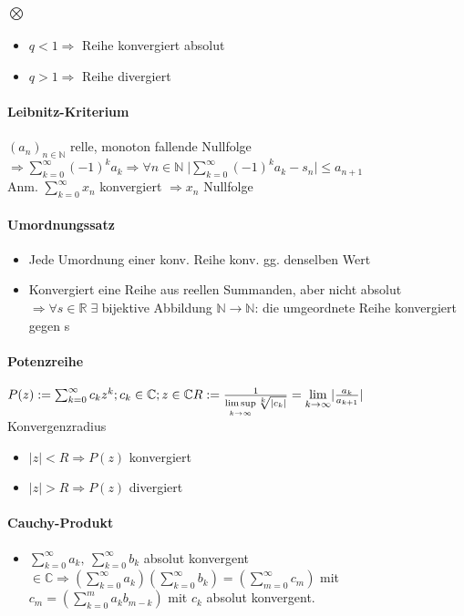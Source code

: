 \documentclass[paper=a3,paper=landscape, fontsize=9pt, DIV=30]{scrartcl}
\newcommand{\real}{{\mathbb{R}}}
\newcommand{\compl}{\mathbb{C}}
\newcommand{\nat}{\mathbb{N}}
\newcommand{\aseq}{(a_n)_{n \in \nat}}
\begin{document}
\begin{multicols*}{4}
  \paragraph{$\bigotimes$}
  \begin{itemize}
  \item $q < 1 \Rightarrow$ Reihe konvergiert absolut
  \item $q > 1 \Rightarrow$ Reihe divergiert
  \end{itemize}

  \paragraph{Leibnitz-Kriterium}
  $\aseq$ relle, monoton fallende Nullfolge $ \Rightarrow \sum_{k=0}^{\infty} (-1)^ka_k \Rightarrow \forall n \in \nat \; \lvert \sum_{k=0}^{\infty}(-1)^ka_k-s_n \rvert \leq  a_{n+1}$\\
  Anm. $\sum_{k=0}^{\infty} x_n$ konvergiert $\Rightarrow x_n$ Nullfolge

  \paragraph{Umordnungssatz}\begin{itemize}
  \item Jede Umordnung einer konv. Reihe konv. gg. denselben Wert
  \item Konvergiert eine Reihe aus reellen Summanden, aber nicht absolut $\Rightarrow \forall s \in \real \; \exists$ bijektive Abbildung $\nat \rightarrow \nat$: die umgeordnete Reihe konvergiert gegen s
\end{itemize}

  \paragraph{Potenzreihe}
    $ P(z) := \sum_{k=0}^{\infty} c_kz^k; c_k \in \compl; z \in \compl\\R := \frac{1}{\limsup\limits_{k \rightarrow \infty} \sqrt[k]{|c_k|}} = \lim\limits_{k \rightarrow \infty} \lvert \frac{a_k}{a_{k+1}} \rvert$ Konvergenzradius
    \begin{itemize}
    	\item $\lvert z \rvert < R \Rightarrow P(z)$ konvergiert
    	\item $\lvert z \rvert > R \Rightarrow P(z)$ divergiert
    \end{itemize}


  \paragraph{Cauchy-Produkt}
  \begin{itemize}
  \item $ \sum_{k=0}^{\infty} a_k,\:\sum_{k=0}^{\infty} b_k$ absolut konvergent $ \in \compl \Rightarrow (\sum_{k=0}^{\infty} a_k) (\sum_{k=0}^{\infty} b_k) = (\sum_{m=0}^{\infty} c_m)$ mit $ c_m=(\sum_{k=0}^{m} a_kb_{m-k})$ mit $c_k$ absolut konvergent.


\end{itemize}
\end{multicols*}
\end{document}
